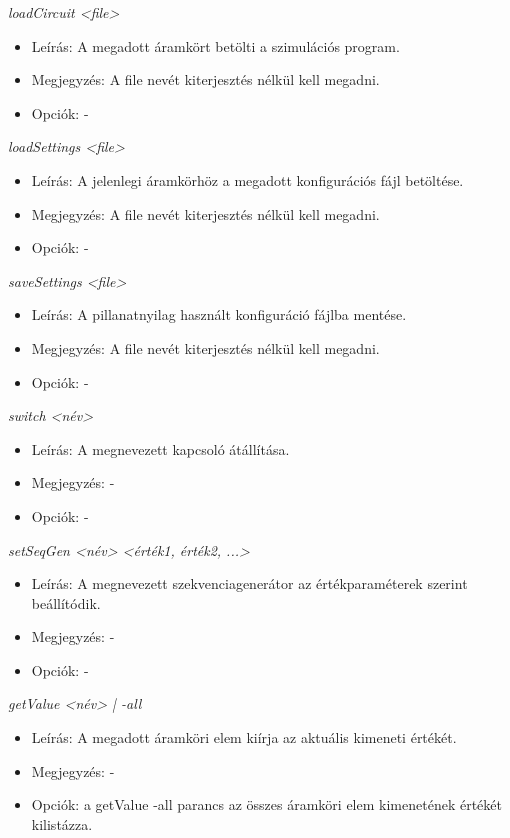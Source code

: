 \textit{loadCircuit <file>}
\begin{itemize}
	\item Leírás: A megadott áramkört betölti a szimulációs program.
	\item Megjegyzés: A file nevét kiterjesztés nélkül kell megadni.
	\item Opciók: -
\end{itemize}

\textit{loadSettings <file>}
\begin{itemize}
	\item Leírás: A jelenlegi áramkörhöz a megadott konfigurációs fájl betöltése.
	\item Megjegyzés: A file nevét kiterjesztés nélkül kell megadni.
	\item Opciók: -
\end{itemize}

\textit{saveSettings <file>}
\begin{itemize}
	\item Leírás: A pillanatnyilag használt konfiguráció fájlba mentése.
	\item Megjegyzés: A file nevét kiterjesztés nélkül kell megadni.
	\item Opciók: -
\end{itemize}

\textit{switch <név>}
\begin{itemize}
	\item Leírás: A megnevezett kapcsoló átállítása.
	\item Megjegyzés: -
	\item Opciók: -
\end{itemize}

\textit{setSeqGen <név> <érték1, érték2, ...>}
\begin{itemize}
	\item Leírás: A megnevezett szekvenciagenerátor az értékparaméterek szerint beállítódik.
	\item Megjegyzés: -
	\item Opciók: -
\end{itemize}

\textit{getValue <név> | -all}
\begin{itemize}
	\item Leírás: A megadott áramköri elem kiírja az aktuális kimeneti értékét.
	\item Megjegyzés: -
	\item Opciók: a getValue -all parancs az összes áramköri elem kimenetének értékét kilistázza.
\end{itemize}

